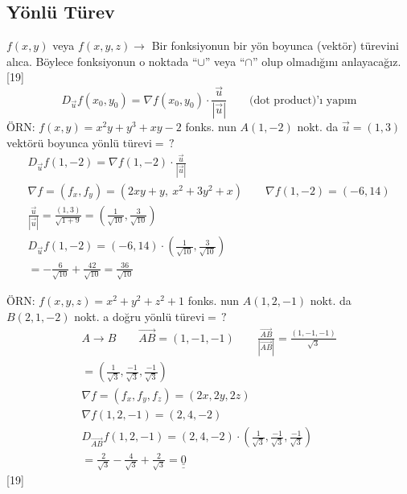 \documentclass[11pt,a4paper]{article}
\begin{document}
\subsection{Yönlü Türev}
$f(x,y)$ veya $f(x,y,z)\to$ Bir fonksiyonun bir yön boyunca (vektör) türevini alıca. Böylece fonksiyonun o noktada ``$\cup$'' veya ``$\cap$'' olup olmadığını anlayacağız.
[19]
\[ D_{\vec{u}}f(x_0,y_0)=\nabla f(x_0,y_0)\cdot\frac{\vec{u}}{|\vec{u}|}\qquad\text{(dot product)'ı yapım} \]
ÖRN: $f(x,y)=x^2y+y^3+xy-2$ fonks. nun $A(1,-2)$ nokt. da $\vec{u}=(1,3)$ vektörü boyunca yönlü türevi$=\,?$
\begin{gather*}
D_{\vec{u}}f(1,-2)=\nabla f(1,-2)\cdot\frac{\vec{u}}{|\vec{u}|}\\
\nabla f=(f_x,f_y)=(2xy+y,\ x^2+3y^2+x)\qquad\nabla f(1,-2)=(-6,14)\\
\frac{\vec{u}}{|\vec{u}|}=\frac{(1,3)}{\sqrt{1+9}}=\left(\frac{1}{\sqrt{10}},\frac{3}{\sqrt{10}}\right)\\
D_{\vec{u}}f(1,-2)=(-6,14)\cdot\left(\frac{1}{\sqrt{10}},\frac{3}{\sqrt{10}}\right)\\
=-\frac{6}{\sqrt{10}}+\frac{42}{\sqrt{10}}=\frac{36}{\sqrt{10}}
\end{gather*}

ÖRN: $f(x,y,z)=x^2+y^2+z^2+1$ fonks. nun $A(1,2,-1)$ nokt. da $B(2,1,-2)$ nokt. a doğru yönlü türevi$=\,?$
\begin{gather*}
A\longrightarrow B\qquad\overrightarrow{AB}=(1,-1,-1)\qquad\frac{\overrightarrow{AB}}{|\overrightarrow{AB}|}=\frac{(1,-1,-1)}{\sqrt3}\\
=\left(\frac{1}{\sqrt3},\frac{-1}{\sqrt3},\frac{-1}{\sqrt3}\right)\\
\nabla f=(f_x,f_y,f_z)=(2x,2y,2z)\\
\nabla f(1,2,-1)=(2,4,-2)\\
D_{\overrightarrow{AB}}f(1,2,-1)=(2,4,-2)\cdot\left(\frac{1}{\sqrt3},\frac{-1}{\sqrt3},\frac{-1}{\sqrt3}\right)\\
=\frac{2}{\sqrt3}-\frac{4}{\sqrt3}+\frac{2}{\sqrt3}=\underline{\underline{0}}
\end{gather*}
[19]
\end{document}
